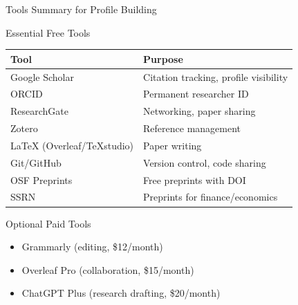 \documentclass[11pt]{beamer}
\begin{document}
				\begin{frame}{Tools Summary for Profile Building}
					\scriptsize
					\begin{block}{Essential Free Tools}
						\centering
						\begin{tabular}{|p{4cm}|p{5.5cm}|}
							\hline
							\textbf{Tool} & \textbf{Purpose} \\
							\hline
							Google Scholar & Citation tracking, profile visibility \\
							\hline
							ORCID & Permanent researcher ID \\
							\hline
							ResearchGate & Networking, paper sharing \\
							\hline
							Zotero & Reference management \\
							\hline
							LaTeX (Overleaf/TeXstudio) & Paper writing \\
							\hline
							Git/GitHub & Version control, code sharing \\
							\hline
							OSF Preprints & Free preprints with DOI \\
							\hline
							SSRN & Preprints for finance/economics \\
							\hline
						\end{tabular}
					\end{block}
					\begin{block}{Optional Paid Tools}
						\begin{itemize}
							\item Grammarly (editing, \$12/month)
							\item Overleaf Pro (collaboration, \$15/month)
							\item ChatGPT Plus (research drafting, \$20/month)
						\end{itemize}
					\end{block}
				\end{frame}
				
\end{document}
